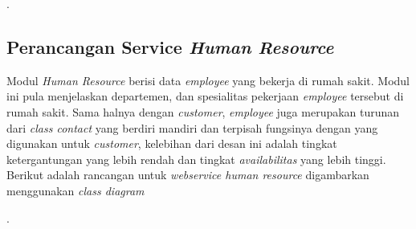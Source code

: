\begin{adjustbox}{width=1\textwidth}
	\begin{minipage}{\linewidth}
		.
	\end{minipage}
\end{adjustbox}
\subsection{Perancangan Service \textit{Human Resource}}
Modul \textit{Human Resource} berisi data \textit{employee} yang bekerja di rumah sakit. Modul ini pula menjelaskan departemen, dan spesialitas pekerjaan \textit{employee} tersebut di rumah sakit. Sama halnya dengan \textit{customer}, \textit{employee} juga merupakan turunan dari \textit{class contact} yang berdiri mandiri dan terpisah fungsinya dengan yang digunakan untuk \textit{customer}, kelebihan dari desan ini adalah tingkat ketergantungan yang lebih rendah dan tingkat \textit{availabilitas} yang lebih tinggi.\\
Berikut adalah rancangan untuk \textit{webservice human resource} digambarkan menggunakan \textit{class diagram}

\begin{adjustbox}{width=1\textwidth}
	\begin{minipage}{\linewidth}
		.
	\end{minipage}
\end{adjustbox}

